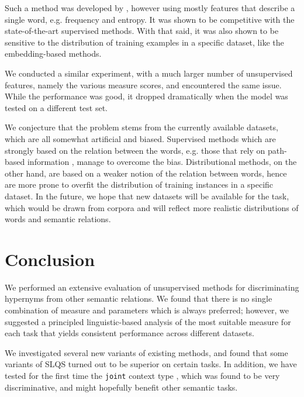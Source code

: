 \documentclass[11pt]{article}
\newcommand\smalltt[1]{\texttt{\small #1}}
\begin{document}
Such a method was developed by , however using mostly features that describe a single word, e.g. frequency and entropy. It was shown to be competitive with the state-of-the-art supervised methods. With that said, it was also shown to be sensitive to the distribution of training examples in a specific dataset, like the embedding-based methods. 

We conducted a similar experiment, with a much larger number of unsupervised features, namely the various measure scores, and encountered the same issue. While the performance was good, it dropped dramatically when the model was tested on a different test set.

We conjecture that the problem stems from the currently available datasets, which are all somewhat artificial and biased. Supervised methods which are strongly based on the relation between the words, e.g. those that rely on path-based information \cite{shwartz2016improving}, manage to overcome the bias. Distributional methods, on the other hand, are based on a weaker notion of the relation between words, hence are more prone to overfit the distribution of training instances in a specific dataset. In the future, we hope that new datasets will be available for the task, which would be drawn from corpora and will reflect more realistic distributions of words and semantic relations.


\section{Conclusion}

We performed an extensive evaluation of unsupervised methods for discriminating hypernyms from other semantic relations. We found that there is no single combination of measure and parameters which is always preferred; however, we suggested a principled linguistic-based analysis of the most suitable measure for each task that yields consistent performance across different datasets. 

We investigated several new variants of existing methods, and found that some variants of SLQS turned out to be superior on certain tasks. In addition, we have tested for the first time the \smalltt{joint} context type \cite{chersoni2016joint}, which was found to be very discriminative, and might hopefully benefit other semantic tasks.
\end{document}
